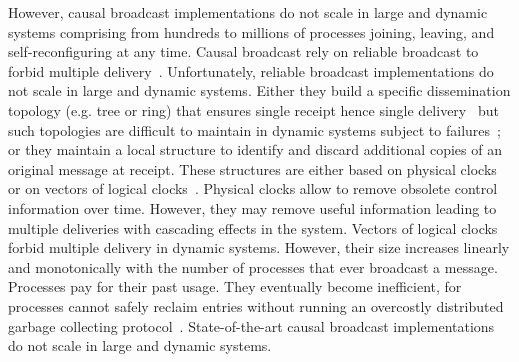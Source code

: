 However, causal broadcast implementations do not scale in large and dynamic
systems comprising from hundreds to millions of processes joining, leaving, and
self-reconfiguring at any time.
%
Causal broadcast rely on reliable broadcast to forbid multiple
delivery~\cite{hadzilacos1994modular}. Unfortunately, reliable broadcast
implementations do not scale in large and dynamic systems. Either they build a
specific dissemination topology (e.g. tree or ring) that ensures single receipt
hence single delivery~\cite{bravo2017saturn,raynal2013distributed} but such
topologies are difficult to maintain in dynamic systems subject to
failures~\cite{krasikova2016hashtable}; or they maintain a local structure to
identify and discard additional copies of an original message at receipt. These
structures are either based on physical
clocks~\cite{cachin2011introduction,demers1987epidemic} or on vectors of logical
clocks~\cite{malkhi2007concise,mukund2014optimized}. Physical clocks allow to
remove obsolete control information over time. However, they may remove useful
information leading to multiple deliveries with cascading effects in the
system. Vectors of logical clocks forbid multiple delivery in dynamic
systems. However, their size increases linearly and monotonically with the
number of processes that ever broadcast a message. Processes pay for their past
usage. They eventually become inefficient, for processes cannot safely reclaim
entries without running an overcostly distributed garbage collecting
protocol~\cite{abdullahi1998garbage}. State-of-the-art causal broadcast
implementations do not scale in large and dynamic systems.


